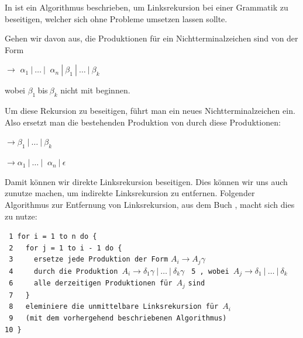 In \cite{Compilers} ist ein Algorithmus beschrieben, um Linksrekursion
bei einer Grammatik zu beseitigen, welcher sich ohne Probleme umsetzen lassen
sollte.\vspace{10pt}

\noindent Gehen wir davon aus, die Produktionen für ein Nichtterminalzeichen
 sind von der Form\vspace{10pt}

 $\to$ $\alpha_1\ |\ \ldots\ |\ $
$\alpha_n\ |\ \beta_1\ |\ \ldots\ |\ \beta_k$\vspace{10pt}

\noindent wobei $\beta_1\ $bis$\ \beta_k$ nicht mit 
beginnen.\vspace{10pt}

\noindent Um diese Rekursion zu beseitigen, führt man ein neues
Nichtterminalzeichen  ein. Also ersetzt man die
bestehenden Produktion von
 durch diese Produktionen:\vspace{10pt}

 $\to \beta_1$$\ |\ \ldots\ |\
\beta_k$

 $\to \alpha_1$$\ |\ \ldots\ |\
$ $\alpha_n$$\ |\ \epsilon$\vspace{10pt}

\noindent Damit können wir direkte Linksrekursion beseitigen. Dies können wir
uns auch zunutze machen, um indirekte Linksrekursion zu entfernen. Folgender
Algorithmus zur Entfernung von Linksrekursion, aus dem Buch \cite{Compilers},
macht sich dies zu nutze:\vspace{10pt}

\noindent
\verb| 1 for i = 1 to n do {|\\
\verb| 2   for j = 1 to i - 1 do {|\\
\verb| 3     ersetze jede Produktion der Form| $A_i \to A_j \gamma$ \verb| |\\ 
\verb| 4     durch die Produktion |$A_i \to \delta_1\gamma\ |\ \ldots\ |\ \delta_k\gamma$
\verb| 5 , wobei |$A_j \to \delta_1\ |\ \ldots\ |\ \delta_k$\\ 
\verb| 6     alle derzeitigen Produktionen für |$A_j$ \verb|sind|\\ 
\verb| 7   }|\\
\verb| 8   eleminiere die unmittelbare Linksrekursion für |$A_i$\\
\verb| 9   (mit dem vorhergehend beschriebenen Algorithmus)|\\
\verb|10 }|
\vspace{10pt}

